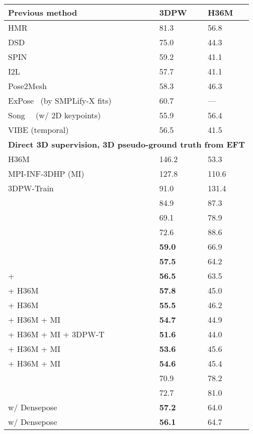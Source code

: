 \documentclass[10pt,twocolumn,letterpaper]{article}
\begin{document}
	\begin{table}[t]
		\centering
		\footnotesize
		\begin{tabular}{l l l}
			\toprule
			\textbf{Previous method}                         & \textbf{3DPW}  & \textbf{H36M}  \\
			\midrule
			HMR~\cite{kanazawa2018end}                       & 81.3                       & 56.8 \\
DSD~\cite{sun2019human}                & 75.0                        & 44.3\\
SPIN~\cite{kolotouros2019spin}                  & 59.2                       & 41.1\\
			I2L~\cite{moon2020i2l}                   & 57.7                       & 41.1\\
			Pose2Mesh~\cite{choi2020pose2mesh}                   & 58.3                       & 46.3 \\
ExPose~\cite{ExPose:2020} (by SMPLify-X fits)                  & 60.7                       & ---\\
			Song~\etal~\cite{song2020human} (w/ 2D keypoints)                   & 55.9                       & 56.4\\
			VIBE (temporal)~\cite{kocabas2019vibe}            & 56.5                       & 41.5\\
			\midrule
\multicolumn{3}{l}{\textbf{Direct 3D supervision, 3D pseudo-ground truth from EFT}}\\
			\midrule
			H36M  & 146.2   & 53.3\\
			MPI-INF-3DHP (MI)   & 127.8 & 110.6 \\
			3DPW-Train    & 91.0  & 131.4\\
			\midrule
			 & 84.9 & 87.3 \\
			    & 69.1  & 78.9 \\
			    & 72.6  & 88.6 \\
			   & \textbf{59.0}  & 66.9 \\
			    & \textbf{57.5} & 64.2 \\
			 +     & \textbf{56.5} & 63.5 \\
			 + H36M & \textbf{57.8} & 45.0 \\
			 + H36M & \textbf{55.5}  & 46.2 \\
			 + H36M + MI    & \textbf{54.7}  & 44.9 \\
			 + H36M + MI + 3DPW-T & \textbf{51.6}  & 44.0 \\
			\midrule
			 + H36M + MI    & \textbf{53.6}  & 45.6 \\
			 + H36M + MI    & \textbf{54.6}  & 45.4 \\
			\midrule
			    & 70.9  & 78.2\\
			   & 72.7 & 81.0 \\
			\midrule
			 w/ Densepose   & \textbf{57.2}  & 64.0\\
 w/ Densepose  & \textbf{56.1} & 64.7 \\



\end{tabular}
\end{table}
\end{document}
